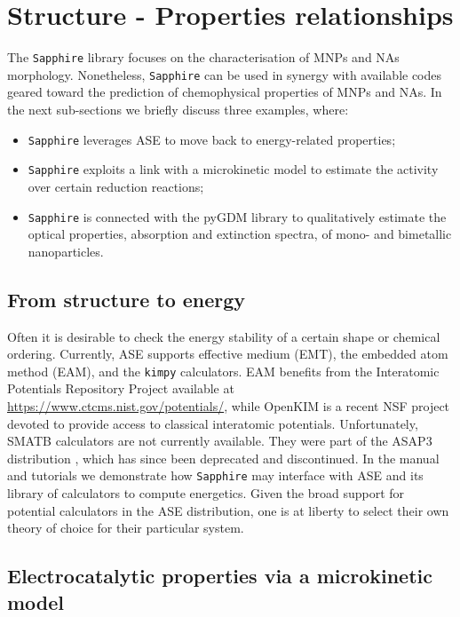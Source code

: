 \section{Structure - Properties relationships}

The \texttt{Sapphire} library focuses on the characterisation of MNPs and NAs morphology.
%
Nonetheless, \texttt{Sapphire} can be used in synergy with available codes geared toward the prediction of chemophysical properties of MNPs and NAs.
%
In the next sub-sections we briefly discuss three examples, where:
\begin{itemize}
    \item \texttt{Sapphire} leverages ASE to move back to energy-related properties; 
    \item \texttt{Sapphire} exploits a link with a microkinetic model \cite{Gazzarrini2021} to estimate the activity over certain reduction reactions; \item \texttt{Sapphire} is connected with the pyGDM \cite{GDM} library to qualitatively estimate the optical properties, absorption and extinction spectra, of mono- and bimetallic nanoparticles.
\end{itemize}

\subsection{From structure to energy} 
Often it is desirable to check the energy stability of a certain shape or chemical ordering. 
Currently, ASE supports effective medium (EMT), the embedded atom method (EAM), and the \texttt{kimpy} calculators. EAM benefits from the Interatomic Potentials Repository Project available at \url{https://www.ctcms.nist.gov/potentials/}, while OpenKIM is a recent NSF project devoted to provide access to  classical interatomic potentials. Unfortunately, SMATB calculators are not currently available. They were part of the ASAP3 distribution \cite{asap3}, which has since been deprecated and discontinued.
In the manual and tutorials we demonstrate how \texttt{Sapphire} may interface with ASE and its library of calculators to compute energetics. Given the broad support for potential calculators in the ASE distribution, one is at liberty to select their own theory of choice for their particular system.

\subsection{Electrocatalytic properties via a microkinetic model}
\label{sec:electrocat}

